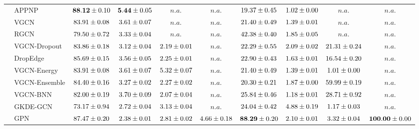 \begin{table*}[!h]
{\begin{tabular}{ll|cccc|cccc}
        \midrule
        
        & APPNP & ${\mathbf{88.12}\tiny \pm 0.10}$ & ${\mathbf{5.44}\tiny \pm 0.05}$ & $n.a.$ & $n.a.$ & ${19.37\tiny \pm 0.45}$ & ${1.02\tiny \pm 0.00}$ & $n.a.$ & $n.a.$\\
        & VGCN & ${83.91\tiny \pm 0.08}$ & ${3.61\tiny \pm 0.07}$ & $n.a.$ & $n.a.$ & ${21.40\tiny \pm 0.49}$ & ${1.39\tiny \pm 0.01}$ & $n.a.$ & $n.a.$\\
        & RGCN & ${79.50\tiny \pm 0.72}$ & ${3.33\tiny \pm 0.04}$ & $n.a.$ & $n.a.$ & ${42.38\tiny \pm 0.40}$ & ${1.85\tiny \pm 0.05}$ & $n.a.$ & $n.a.$\\
        & VGCN-Dropout & ${83.86\tiny \pm 0.18}$ & ${3.12\tiny \pm 0.04}$ & ${2.19\tiny \pm 0.01}$ & $n.a.$ & ${22.29\tiny \pm 0.55}$ & ${2.09\tiny \pm 0.02}$ & ${21.31\tiny \pm 0.24}$ & $n.a.$\\
        & DropEdge & ${85.69\tiny \pm 0.15}$ & ${3.56\tiny \pm 0.05}$ & ${2.25\tiny \pm 0.01}$ & $n.a.$ & ${22.90\tiny \pm 0.43}$ & ${1.63\tiny \pm 0.01}$ & ${16.54\tiny \pm 0.20}$ & $n.a.$\\
        & VGCN-Energy & ${83.91\tiny \pm 0.08}$ & ${3.61\tiny \pm 0.07}$ & ${{5.32}\tiny \pm 0.07}$ & $n.a.$ & ${21.40\tiny \pm 0.49}$ & ${1.39\tiny \pm 0.01}$ & ${1.01\tiny \pm 0.00}$ & $n.a.$\\
        & VGCN-Ensemble & ${84.40\tiny \pm 0.16}$ & ${3.27\tiny \pm 0.02}$ & ${2.27\tiny \pm 0.02}$ & $n.a.$ & ${20.30\tiny \pm 0.21}$ & ${1.87\tiny \pm 0.00}$ & ${{59.99}\tiny \pm 0.19}$ & $n.a.$\\
        & VGCN-BNN & ${82.00\tiny \pm 0.19}$ & ${3.70\tiny \pm 0.09}$ & ${2.07\tiny \pm 0.04}$ & $n.a.$ & ${25.84\tiny \pm 0.46}$ & ${1.18\tiny \pm 0.01}$ & ${28.71\tiny \pm 0.92}$ & $n.a.$\\
        & GKDE-GCN & ${73.17\tiny \pm 0.94}$ & ${2.72\tiny \pm 0.04}$ & ${3.13\tiny \pm 0.04}$ & $n.a.$ & ${24.04\tiny \pm 0.42}$ & ${4.88\tiny \pm 0.19}$ & ${1.17\tiny \pm 0.03}$ & $n.a.$\\
        & GPN & ${87.47\tiny \pm 0.20}$ & ${2.38\tiny \pm 0.01}$ & ${2.81\tiny \pm 0.02}$ & ${4.66\tiny \pm 0.18}$ & ${\mathbf{88.29}\tiny \pm 0.20}$ & ${2.10\tiny \pm 0.01}$ & ${3.32\tiny \pm 0.04}$ & ${\mathbf{100.00}\tiny \pm 0.00}$\\


\end{tabular}}
\end{table*}
